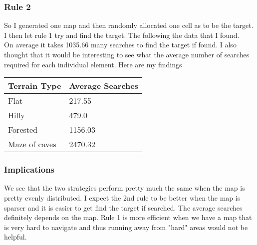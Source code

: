 \documentclass[12pt]{article} %
\begin{document}
\begin{itemize}
\subsubsection{Rule 2}
So I generated one map and then randomly allocated one cell as to be the target. I then let rule 1 try and find the target. The following the data that I found. \\
On average it takes 1035.66 many searches to find the target if found. I also thought that it would be interesting to see what the average number of searches required for each individual element. Here are my findings 
\begin{center}
\begin{table}[H]
\begin{tabular}{|l|l|}
\hline
Terrain Type  & Average Searches \\ \hline
Flat          & 217.55           \\ \hline
Hilly         & 479.0            \\ \hline
Forested      & 1156.03          \\ \hline
Maze of caves & 2470.32          \\ \hline
\end{tabular}
\end{table}
\end{center}

\subsubsection{Implications}
We see that the two strategies perform pretty much the same when the map is pretty evenly distributed. I expect the 2nd rule to be better when the map is sparser and it is easier to get find the target if searched. The average searches definitely depends on the map. Rule 1 is more efficient when we have a map that is very hard to navigate and thus running away from "hard" areas would not be helpful.  


\end{itemize}
\end{document}
